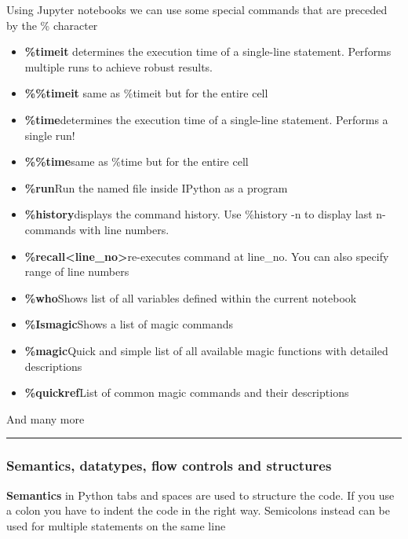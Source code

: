 Using Jupyter notebooks we can use some special commands that are preceded by the \% character
\begin{itemize}
    \item \textbf{\%timeit} \ra determines the execution time of a single-line
statement. Performs multiple runs to achieve robust results.
    \item \textbf{\%\%timeit} \ra same as \%timeit but for the entire cell
    \item \textbf{\%time}\ra determines the execution time of a single-line
statement. Performs a single run!
    \item \textbf{\%\%time}\ra same as \%time but for the entire cell
    \item \textbf{\%run}\ra Run the named file inside IPython as a program
    \item \textbf{\%history}\ra displays the command history. Use \%history -n to display last n-commands with line
numbers.
    \item \textbf{\%recall<line\_no>}\ra  re-executes command at line\_no. You can also specify range of line numbers
    \item \textbf{\%who}\ra Shows list of all variables defined within the current notebook
    \item \textbf{\%Ismagic}\ra Shows a list of magic commands
    \item \textbf{\%magic}\ra Quick and simple list of all available magic functions with detailed descriptions
    \item \textbf{\%quickref}\ra List of common magic commands and their descriptions
\end{itemize}

And many more

\vspace{10pt}

\hrule

\subsubsection{Semantics, datatypes, flow controls and structures}

\vspace{10pt}

\textbf{Semantics} \ra in Python tabs and spaces are used to structure the code. If you use a colon you have to indent the code in the right way. Semicolons instead can be used for multiple statements on the same line

\vspace{10pt}

